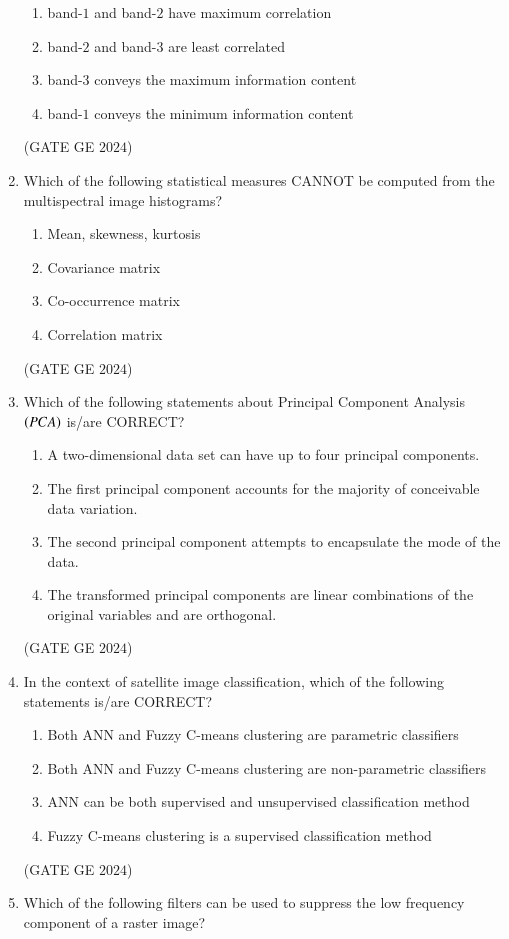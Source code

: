 \documentclass[journal,12pt,onecolumn]{IEEEtran}
\theoremstyle{remark}
\begin{document}
\begin{enumerate}
\begin{enumerate}
\item band-$1$ and band-$2$ have maximum correlation
\item band-$2$ and band-$3$ are least correlated
\item band-$3$ conveys the maximum information content
\item band-$1$ conveys the minimum information content
\end{enumerate}
\hfill{(GATE GE $2024$)}
\bigskip
\item Which of the following statistical measures CANNOT be computed from the multispectral image histograms?
\begin{enumerate}
\item Mean, skewness, kurtosis
\item Covariance matrix
\item Co-occurrence matrix
\item Correlation matrix
\end{enumerate}
\hfill{(GATE GE $2024$)}
\bigskip
\item Which of the following statements about Principal Component Analysis $\left(PCA\right)$ is/are CORRECT?
\begin{enumerate}
\item A two-dimensional data set can have up to four principal components.
\item The first principal component accounts for the majority of conceivable data variation.
\item The second principal component attempts to encapsulate the mode of the data.
\item The transformed principal components are linear combinations of the original variables and are orthogonal.
\end{enumerate}
\hfill{(GATE GE $2024$)}
\bigskip
\item In the context of satellite image classification, which of the following statements is/are CORRECT?
\begin{enumerate}
\item Both ANN and Fuzzy C-means clustering are parametric classifiers
\item Both ANN and Fuzzy C-means clustering are non-parametric classifiers
\item ANN can be both supervised and unsupervised classification method
\item Fuzzy C-means clustering is a supervised classification method
\end{enumerate}
\hfill{(GATE GE $2024$)}
\bigskip
\item Which of the following filters can be used to suppress the low frequency component of a raster image?
\begin{center}


\end{center}
\end{enumerate}
\end{document}
